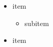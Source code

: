 \documentclass[a4paper]{article}
\begin{document}
    \tableofcontents
    \clearpage
    
    
    \begin{itemize}
        \item item
        \begin{itemize}
            \item subitem
        \end{itemize}
        \item item
    \end{itemize}


    \clearpage
    
    
    \clearpage
    \printglossaries
\end{document}
